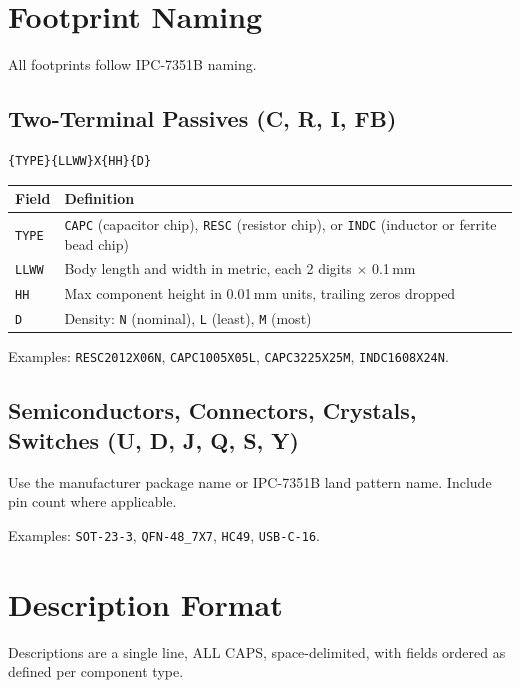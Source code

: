 \documentclass[11pt,a4paper]{article}
\begin{document}
\section{Footprint Naming}

All footprints follow IPC-7351B naming.

\subsection{Two-Terminal Passives (C, R, I, FB)}

\begin{verbatim}
{TYPE}{LLWW}X{HH}{D}
\end{verbatim}

\begin{tabular}{@{}lL{10cm}@{}}
\toprule
Field & Definition \\
\midrule
\texttt{TYPE} & \texttt{CAPC} (capacitor chip), \texttt{RESC} (resistor chip), or \texttt{INDC} (inductor or ferrite bead chip) \\
\texttt{LLWW} & Body length and width in metric, each 2 digits $\times$ 0.1\,mm \\
\texttt{HH}   & Max component height in 0.01\,mm units, trailing zeros dropped \\
\texttt{D}    & Density: \texttt{N} (nominal), \texttt{L} (least), \texttt{M} (most) \\
\bottomrule
\end{tabular}

Examples: \texttt{RESC2012X06N}, \texttt{CAPC1005X05L}, \texttt{CAPC3225X25M}, \texttt{INDC1608X24N}.

\subsection{Semiconductors, Connectors, Crystals, Switches (U, D, J, Q, S, Y)}

Use the manufacturer package name or IPC-7351B land pattern name. Include pin count where applicable.

Examples: \texttt{SOT-23-3}, \texttt{QFN-48\_7X7}, \texttt{HC49}, \texttt{USB-C-16}.

\section{Description Format}

Descriptions are a single line, ALL CAPS, space-delimited, with fields ordered as defined per component type.
\end{document}
